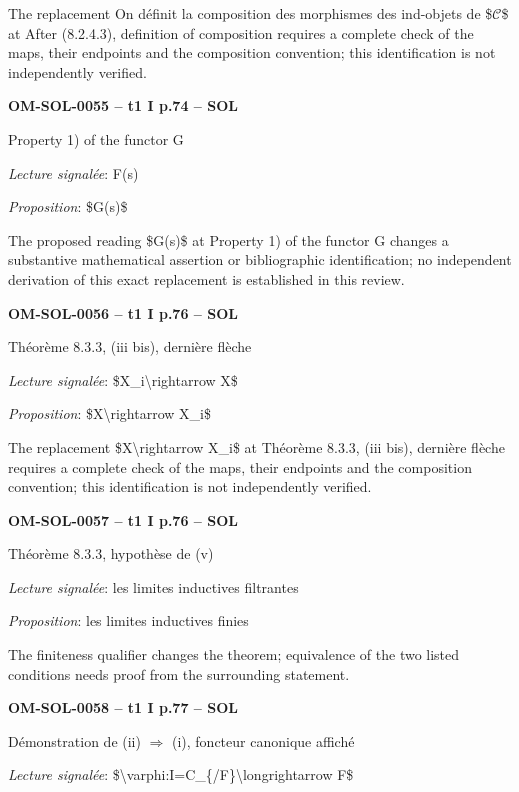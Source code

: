 The replacement On définit la composition des morphismes des ind-objets de \$\ensuremath{𝒞}\$ at After (8.2.4.3), definition of composition requires a complete check of the maps, their endpoints and the composition convention; this identification is not independently verified.\par
\par\noindent\textbf{OM-SOL-0055 -- t1 I p.74 -- SOL}\par
Property 1) of the functor G\par
\emph{Lecture signalée}: F(s)\par
\emph{Proposition}: \$G(s)\$\par
The proposed reading \$G(s)\$ at Property 1) of the functor G changes a substantive mathematical assertion or bibliographic identification; no independent derivation of this exact replacement is established in this review.\par
\par\noindent\textbf{OM-SOL-0056 -- t1 I p.76 -- SOL}\par
Théorème 8.3.3, (iii bis), dernière flèche\par
\emph{Lecture signalée}: \$X\_i\textbackslash{}rightarrow X\$\par
\emph{Proposition}: \$X\textbackslash{}rightarrow X\_i\$\par
The replacement \$X\textbackslash{}rightarrow X\_i\$ at Théorème 8.3.3, (iii bis), dernière flèche requires a complete check of the maps, their endpoints and the composition convention; this identification is not independently verified.\par
\par\noindent\textbf{OM-SOL-0057 -- t1 I p.76 -- SOL}\par
Théorème 8.3.3, hypothèse de (v)\par
\emph{Lecture signalée}: les limites inductives filtrantes\par
\emph{Proposition}: les limites inductives finies\par
The finiteness qualifier changes the theorem; equivalence of the two listed conditions needs proof from the surrounding statement.\par
\par\noindent\textbf{OM-SOL-0058 -- t1 I p.77 -- SOL}\par
Démonstration de (ii) \ensuremath{\Rightarrow} (i), foncteur canonique affiché\par
\emph{Lecture signalée}: \$\textbackslash{}varphi:I=\allowbreak C\_\{/F\}\textbackslash{}longrightarrow F\$\par
